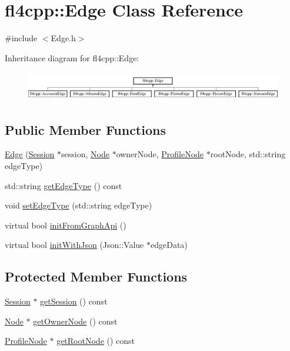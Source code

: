 \hypertarget{classfl4cpp_1_1_edge}{}\section{fl4cpp\+:\+:Edge Class Reference}
\label{classfl4cpp_1_1_edge}


{\ttfamily \#include $<$Edge.\+h$>$}

Inheritance diagram for fl4cpp\+:\+:Edge\+:\begin{figure}[H]
\begin{center}
\leavevmode
\includegraphics[height=1.305361cm]{classfl4cpp_1_1_edge}
\end{center}
\end{figure}
\subsection*{Public Member Functions}
\begin{DoxyCompactItemize}
\item 
\hyperlink{classfl4cpp_1_1_edge_af454fff745e0ac353ec1bf05a8168ce7}{Edge} (\hyperlink{classfl4cpp_1_1_session}{Session} $\ast$session, \hyperlink{classfl4cpp_1_1_node}{Node} $\ast$owner\+Node, \hyperlink{classfl4cpp_1_1_profile_node}{Profile\+Node} $\ast$root\+Node, std\+::string edge\+Type)
\item 
std\+::string \hyperlink{classfl4cpp_1_1_edge_a005aa0bd5c0ca3634829687ffdd3ac8c}{get\+Edge\+Type} () const 
\item 
void \hyperlink{classfl4cpp_1_1_edge_af5648af32d7a141f4462b88f7541b5ec}{set\+Edge\+Type} (std\+::string edge\+Type)
\item 
virtual bool \hyperlink{classfl4cpp_1_1_edge_ad60e5e96c53340669211c0a7e6097e16}{init\+From\+Graph\+Api} ()
\item 
virtual bool \hyperlink{classfl4cpp_1_1_edge_a27d724789467572a7deb2cabad784f81}{init\+With\+Json} (Json\+::\+Value $\ast$edge\+Data)
\end{DoxyCompactItemize}
\subsection*{Protected Member Functions}
\begin{DoxyCompactItemize}
\item 
\hyperlink{classfl4cpp_1_1_session}{Session} $\ast$ \hyperlink{classfl4cpp_1_1_edge_abec0de47445dc0132955615060219b14}{get\+Session} () const 
\item 
\hyperlink{classfl4cpp_1_1_node}{Node} $\ast$ \hyperlink{classfl4cpp_1_1_edge_a77f406df7586f3c31d41630be6a821eb}{get\+Owner\+Node} () const 
\item 
\hyperlink{classfl4cpp_1_1_profile_node}{Profile\+Node} $\ast$ \hyperlink{classfl4cpp_1_1_edge_a59cae73e30e7e8bc5f7f2a7a3c1b9292}{get\+Root\+Node} () const 
\end{DoxyCompactItemize}
